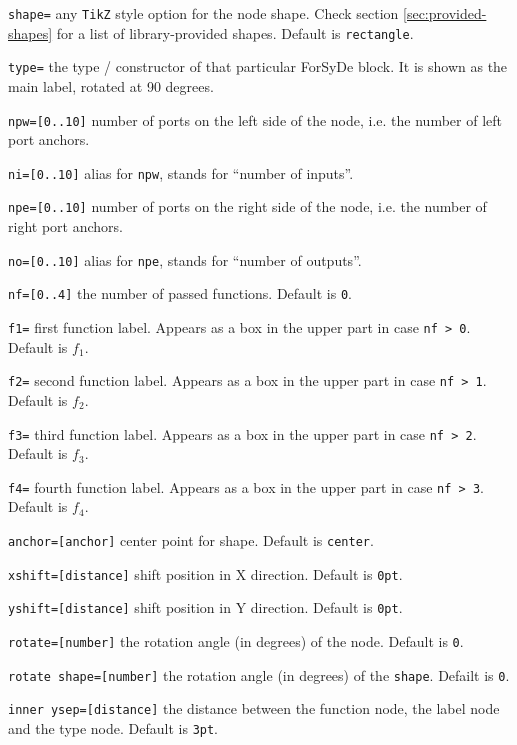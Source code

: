 \documentclass[10pt]{article}
\newenvironment{optionslist}[0]{ 
\begin{list}{}{
	\setlength{\itemindent}{-10pt}
	\setlength{\itemsep}{0pt}
	\setlength{\parsep}{0pt}
}}{\end{list}}
\begin{document}
\begin{optionslist}
\item \texttt{shape=} any \texttt{TikZ} style option for the node shape. Check section \ref{sec:provided-shapes} for a list of library-provided shapes. Default is \texttt{rectangle}.
\item \texttt{type=} the type / constructor of that particular ForSyDe block. It is shown as the main label, rotated at 90 degrees.
\item \texttt{npw=[0..10]} number of ports on the left side of the node, i.e. the number of left port anchors.
\item \texttt{ni=[0..10]} alias for \texttt{npw}, stands for ``number of inputs''.
\item \texttt{npe=[0..10]} number of ports on the right side of the node, i.e. the number of right port anchors.
\item \texttt{no=[0..10]} alias for \texttt{npe}, stands for ``number of outputs''.
\item \texttt{nf=[0..4]} the number of passed functions. Default is \texttt{0}.
\item \texttt{f1=} first function label. Appears as a box in the upper part in case \texttt{nf > 0}. Default is $f_1$.
\item \texttt{f2=} second function label. Appears as a box in the upper part in case \texttt{nf > 1}. Default is $f_2$.
\item \texttt{f3=} third function label. Appears as a box in the upper part in case \texttt{nf > 2}. Default is $f_3$.
\item \texttt{f4=} fourth function label. Appears as a box in the upper part in case \texttt{nf > 3}. Default is $f_4$.
\item \texttt{anchor=[anchor]} center point for shape. Default is \texttt{center}.
\item \texttt{xshift=[distance]} shift position in X direction. Default is \texttt{0pt}.
\item \texttt{yshift=[distance]} shift position in Y direction. Default is \texttt{0pt}.
\item \texttt{rotate=[number]} the rotation angle (in degrees) of the node. Default is \texttt{0}.
\item \texttt{rotate shape=[number]} the rotation angle (in degrees) of the \texttt{shape}. Defailt is \texttt{0}.
\item \texttt{inner ysep=[distance]} the distance between the function node, the label node and the type node. Default is \texttt{3pt}.
\end{optionslist}
\end{document}
